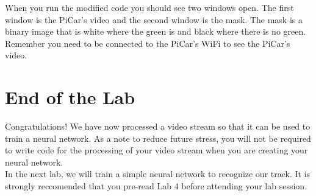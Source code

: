 \documentclass[11pt]{report}
\begin{document}
When you run the modified code you should see two windows open. The first window is the PiCar's video and the second window is the mask. The mask is a binary image that is white where the green is and black where there is no green. Remember you need to be connected to the PiCar's WiFi to see the PiCar's video.


\chapter{End of the Lab}
Congratulations! We have now processed a video stream so that it can be used to train a neural network. As a note to reduce future stress, you will not be required to write code for the processing of your video stream when you are creating your neural network. 
\\
In the next lab, we will train a simple neural network to recognize our track. It is strongly reccomended that you pre-read Lab 4 before attending your lab session.
\end{document}
